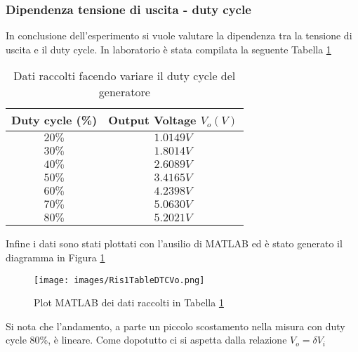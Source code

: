 \subsubsection{Dipendenza tensione di uscita - duty cycle}
In conclusione dell'esperimento si vuole valutare la dipendenza tra la tensione di uscita e il duty cycle. In laboratorio è stata compilata la seguente Tabella \ref{tab:TabPlot}
\begin{table}[H]
    \centering
    \begin{tabular}{|c|c|}
        \hline
        Duty cycle (\%)&Output Voltage $V_o(V)$\\\hline\hline
        $20\%$&$1.0149V$\\\hline
        $30\%$&$1.8014V$\\\hline
        $40\%$&$2.6089V$\\\hline
        $50\%$&$3.4165V$\\\hline
        $60\%$&$4.2398V$\\\hline
        $70\%$&$5.0630V$\\\hline
        $80\%$&$5.2021V$\\\hline
    \end{tabular}
    \caption{Dati raccolti facendo variare il duty cycle del generatore}
    \label{tab:TabPlot}
\end{table}
Infine i dati sono stati plottati con l'ausilio di MATLAB ed è stato generato il diagramma in Figura \ref{fig:MatlabPlot1}
\begin{figure}[H]
    \centering
    \texttt{[image: images/Ris1TableDTCVo.png]}
    \caption{Plot MATLAB dei dati raccolti in Tabella \ref{tab:TabPlot}}
    \label{fig:MatlabPlot1}
\end{figure}
Si nota che l'andamento, a parte un piccolo scostamento nella misura con duty cycle 80\%, è lineare. Come dopotutto ci si aspetta dalla relazione $V_o=\delta V_i$